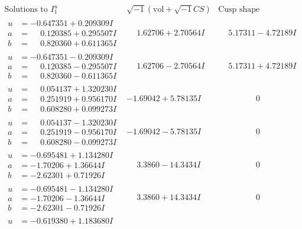 \documentclass[1p]{elsarticle_modified}
\theoremstyle{definition}
\newcommand{\I}{\sqrt{-1}}
\begin{document}
$$\begin{array}{c|c|c}
\text{Solutions to }I^u_{1}& \I (\text{vol} + \sqrt{-1}CS) & \text{Cusp shape}\\
 \hline 
\begin{aligned}
u &= -0.647351 + 0.209309 I \\
a &= \phantom{-}0.120385 + 0.295507 I \\
b &= \phantom{-}0.820360 + 0.611365 I\end{aligned}
 & \phantom{-}1.62706 + 2.70564 I & \phantom{-}5.17311 - 4.72189 I \\ \hline\begin{aligned}
u &= -0.647351 - 0.209309 I \\
a &= \phantom{-}0.120385 - 0.295507 I \\
b &= \phantom{-}0.820360 - 0.611365 I\end{aligned}
 & \phantom{-}1.62706 - 2.70564 I & \phantom{-}5.17311 + 4.72189 I \\ \hline\begin{aligned}
u &= \phantom{-}0.054137 + 1.320230 I \\
a &= \phantom{-}0.251919 + 0.956170 I \\
b &= \phantom{-}0.608280 + 0.099273 I\end{aligned}
 & -1.69042 + 5.78135 I & \phantom{-0.000000 } 0 \\ \hline\begin{aligned}
u &= \phantom{-}0.054137 - 1.320230 I \\
a &= \phantom{-}0.251919 - 0.956170 I \\
b &= \phantom{-}0.608280 - 0.099273 I\end{aligned}
 & -1.69042 - 5.78135 I & \phantom{-0.000000 } 0 \\ \hline\begin{aligned}
u &= -0.695481 + 1.134280 I \\
a &= -1.70206 + 1.36644 I \\
b &= -2.62301 + 0.71926 I\end{aligned}
 & \phantom{-}3.3860 - 14.3434 I & \phantom{-0.000000 } 0 \\ \hline\begin{aligned}
u &= -0.695481 - 1.134280 I \\
a &= -1.70206 - 1.36644 I \\
b &= -2.62301 - 0.71926 I\end{aligned}
 & \phantom{-}3.3860 + 14.3434 I & \phantom{-0.000000 } 0 \\ \hline\begin{aligned}
u &= -0.619380 + 1.183680 I \\

\end{aligned}
\end{array}$$
\end{document}
